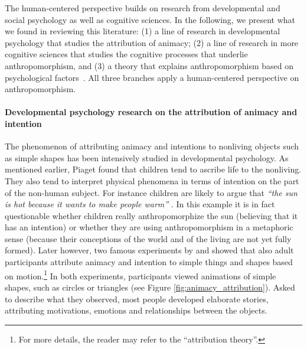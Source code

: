 \documentclass{frontiersSCNS} %
\begin{document}
The human-centered perspective builds on research from developmental and social psychology as well as cognitive sciences.  In the following, we present what we found in reviewing this literature: (1) a line of research in developmental psychology that studies the attribution of animacy; (2) a line of research in more cognitive sciences that studies the cognitive processes that underlie anthropomorphism, and (3) a theory that explains anthropomorphism based on psychological factors~\citep{epley_seeing_2007}. All three branches apply a human-centered perspective on anthropomorphism.


\paragraph*{Developmental psychology research on the attribution of animacy and intention\\}

The phenomenon of attributing animacy and intentions to nonliving objects such as simple shapes has been intensively studied in developmental psychology. As mentioned earlier, Piaget found that children tend to ascribe life to the nonliving. They also tend to interpret physical phenomena in terms of intention on the part of the non-human subject. For instance children are likely to argue that \textit{``the sun is hot because it wants to make people warm''} \citep{leeds_childrens_1992}. In this example it is in fact questionable whether children really anthropomorphize the sun (believing that it has an intention) or whether they are using anthropomorphism in a metaphoric sense (because their conceptions of the world and of the living are not yet fully formed). Later however, two famous experiments by \cite{heider_experimental_1944} and \cite{michotte_perception_1963} showed that also adult participants attribute animacy and intention to simple things and shapes based on motion.\footnote{For more details, the reader may refer to the ``attribution theory''.} In both experiments, participants viewed animations of simple shapes, such as circles or triangles (see Figure \ref{fig:animacy_attribution}). Asked to describe what they observed, most people developed elaborate stories, attributing motivations, emotions and relationships between the objects.
\end{document}
